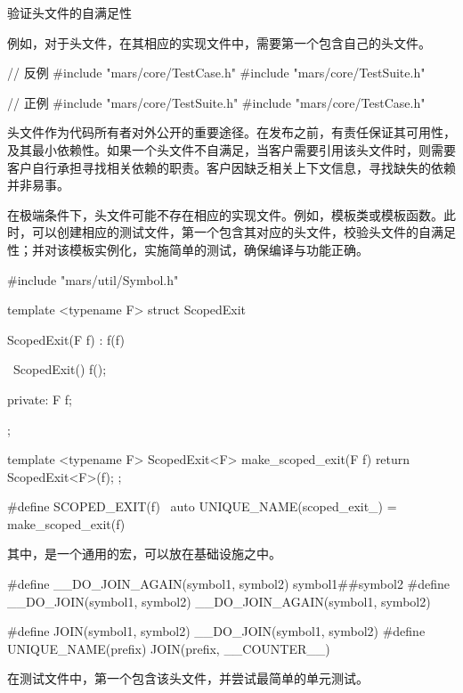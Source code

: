 \begin{content}
\begin{episode}{验证头文件的自满足性}
\begin{content}
例如，对于头文件，在其相应的实现文件中，需要第一个包含自己的头文件。

\begin{inlinediff}
 \begin{minicpp}
// 反例
#include "mars/core/TestCase.h"
#include "mars/core/TestSuite.h"
 \end{minicpp} 
\tcblower
 \begin{minicpp}
// 正例
#include "mars/core/TestSuite.h"
#include "mars/core/TestCase.h"
 \end{minicpp} 
\end{inlinediff}

头文件作为代码所有者对外公开的重要途径。在发布之前，有责任保证其可用性，及其最小依赖性。如果一个头文件不自满足，当客户需要引用该头文件时，则需要客户自行承担寻找相关依赖的职责。客户因缺乏相关上下文信息，寻找缺失的依赖并非易事。

在极端条件下，头文件可能不存在相应的实现文件。例如，模板类或模板函数。此时，可以创建相应的测试文件，第一个包含其对应的头文件，校验头文件的自满足性；并对该模板实例化，实施简单的测试，确保编译与功能正确。

\begin{c++}[title={\ttfamily{实现ScopedExit：include/mars/util/ScopedExit.h}}]
#include "mars/util/Symbol.h"

template <typename F>
struct ScopedExit {
  ScopedExit(F f) : f(f) {
  }

  ~ScopedExit(){ 
    f(); 
  }

private:
  F f;
};

template <typename F>
ScopedExit<F> make_scoped_exit(F f) {
  return ScopedExit<F>(f);
};

#define SCOPED_EXIT(f) \
    auto UNIQUE_NAME(scoped_exit_) = make_scoped_exit(f)
\end{c++}

其中，是一个通用的宏，可以放在基础设施之中。

\begin{c++}[title={\ttfamily{实用宏：include/mars/util/Symbol.h}}]
#define __DO_JOIN_AGAIN(symbol1, symbol2) symbol1##symbol2
#define __DO_JOIN(symbol1, symbol2) __DO_JOIN_AGAIN(symbol1, symbol2)

#define JOIN(symbol1, symbol2) __DO_JOIN(symbol1, symbol2)
#define UNIQUE_NAME(prefix) JOIN(prefix, __COUNTER__)
\end{c++}

在测试文件中，第一个包含该头文件，并尝试最简单的单元测试。


\end{content}
\end{episode}
\end{content}
